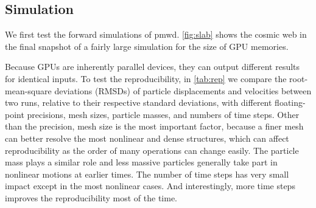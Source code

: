 \documentclass[modern, dvipsnames]{aastex631}
\newcommand{\pmwd}{{\usefont{T1}{nova}{m}{sl}pmwd}}
\begin{document}
\vspace{1em}
\subsection{Simulation}

We first test the forward simulations of \pmwd.
\autoref{fig:slab} shows the cosmic web in the final snapshot of a
fairly large simulation for the size of GPU memories.

Because GPUs are inherently parallel devices, they can output different
results for identical inputs.
To test the reproducibility, in \autoref{tab:rep} we compare the
root-mean-square deviations (RMSDs) of particle displacements and
velocities between two runs, relative to their respective standard
deviations, with different floating-point precisions, mesh sizes,
particle masses, and numbers of time steps.
Other than the precision, mesh size is the most important factor,
because a finer mesh can better resolve the most nonlinear and dense
structures, which can affect reproducibility as the order of many
operations can change easily.
The particle mass plays a similar role and less massive particles
generally take part in nonlinear motions at earlier times.
The number of time steps has very small impact except in the most
nonlinear cases.
And interestingly, more time steps improves the reproducibility most of
the time.
\end{document}
